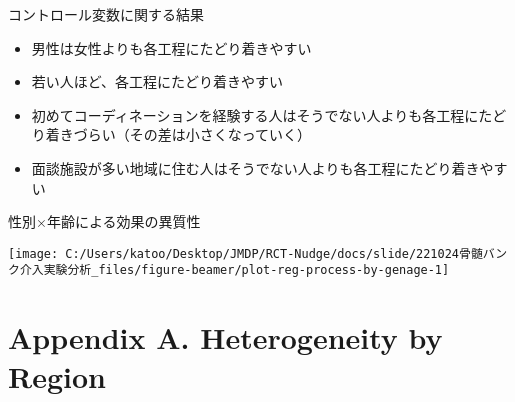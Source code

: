 \documentclass[
      aspectratio=169,
        12pt,
    ]{beamer}
\providecommand{\tightlist}{%
  \setlength{\itemsep}{0pt}\setlength{\parskip}{0pt}}
\begin{document}
\begin{frame}{コントロール変数に関する結果}
\protect\hypertarget{ux30b3ux30f3ux30c8ux30edux30fcux30ebux5909ux6570ux306bux95a2ux3059ux308bux7d50ux679c}{}
\begin{itemize}
\tightlist
\item
  男性は女性よりも各工程にたどり着きやすい
\item
  若い人ほど、各工程にたどり着きやすい
\item
  初めてコーディネーションを経験する人はそうでない人よりも各工程にたどり着きづらい（その差は小さくなっていく）
\item
  面談施設が多い地域に住む人はそうでない人よりも各工程にたどり着きやすい
\end{itemize}
\end{frame}

\begin{frame}{性別×年齢による効果の異質性}
\protect\hypertarget{ux6027ux5225ux5e74ux9f62ux306bux3088ux308bux52b9ux679cux306eux7570ux8ceaux6027-1}{}
\begin{center}\texttt{[image: C:/Users/katoo/Desktop/JMDP/RCT-Nudge/docs/slide/221024骨髄バンク介入実験分析\_files/figure-beamer/plot-reg-process-by-genage-1]} \end{center}
\end{frame}

\hypertarget{appendix-a.-heterogeneity-by-region}{%
\section{Appendix A. Heterogeneity by Region}\label{appendix-a.-heterogeneity-by-region}}
\end{document}
